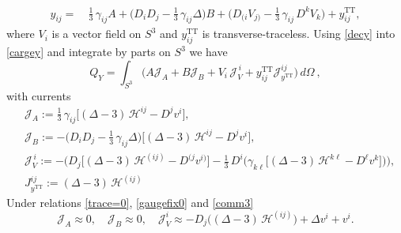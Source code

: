 \documentclass[a4paper,12pt]{article}
\begin{document}
\begin{equation}
\begin{aligned}
y_{ij}
=&\ \frac13\,\gamma_{ij}A
+\Big(D_{i}D_{j}-\frac13\,\gamma_{ij}\Delta\Big)B
+\Big(D_{(i}V_{j)}-\frac13\,\gamma_{ij}\,D^kV_k\Big) + y_{ij}^{\text{TT}},
\label{decy}
\end{aligned}
\end{equation}
where $V_{i}$ is a vector field on $S^{3}$ and $y_{ij}^{\text{TT}}$ is transverse-traceless. Using \eqref{decy} into \eqref{cargey} and integrate by parts on $S^{3}$ we have
\begin{equation}
Q_{Y}
=
\int_{S^{3}}
\Big(
A\mathcal{J}_{A}
+B\mathcal{J}_{B}
+V_{i}\,\mathcal{J}_{V}^{\,i}+y_{ij}^{\text{TT}}\mathcal{J}^{ij}_{y^{\text{TT}}}
\Big)\,
d\Omega \ ,
\label{}
\end{equation}
with currents
\begin{equation}
\begin{aligned}
&\mathcal{J}_{A}
:=
\frac13\,\gamma_{ij}\bigg[(\Delta-3)\,\mathcal{H}^{ij}-D^{j}v^{i}\bigg],\\
&\mathcal{J}_{B}
:=
-\Big(D_{i}D_{j}-\frac13\,\gamma_{ij}\Delta\Big)\bigg[(\Delta-3)\,\mathcal{H}^{ij}-D^{j}v^{i}\bigg], \\
&\mathcal{J}_{V}^{\,i}
:=
-\Bigg(D_{j}\bigg[(\Delta-3)\,\mathcal{H}^{(ij)}-D^{(j}v^{i)}\bigg]-\frac13\,D^{i}\bigg(\gamma_{k\ell}\bigg[(\Delta-3)\,\mathcal{H}^{k\ell}-D^{\ell}v^{k}\bigg]\bigg)\Bigg), \\
&J^{ij}_{y^{\text{TT}}}:=(\Delta-3)\,\mathcal{H}^{(ij)}
\end{aligned}
\end{equation}
Under relations \eqref{trace=0}, \eqref{gaugefix0} and \eqref{comm3}
\begin{equation}
    \mathcal{J}_A\approx 0, \quad \mathcal{J}_B\approx 0,  \quad \mathcal{J}^i_V \approx -D_{j}\big((\Delta-3)\,\mathcal{H}^{(ij)}\big)+\Delta v^i +v^i.
\end{equation}
\end{document}
